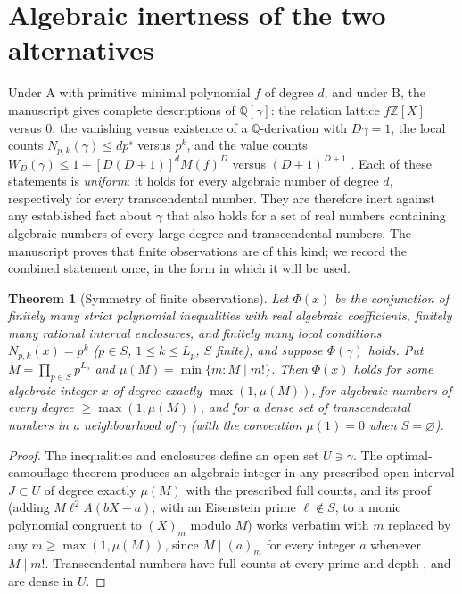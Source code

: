 \documentclass[11pt,a4paper]{article}
\newcommand{\Q}{\mathbb Q}
\newcommand{\Z}{\mathbb Z}
\newtheorem{theorem}{Theorem}[section]
\theoremstyle{definition}
\theoremstyle{remark}
\numberwithin{equation}{section}
\begin{document}
\section{Algebraic inertness of the two alternatives}\label{I:sec:inert}

Under $\mathrm A$ with primitive minimal polynomial $f$ of degree $d$, and under $\mathrm B$,
the manuscript gives complete descriptions of $\Q[\gamma]$: the relation lattice
$f\Z[X]$ versus $0$, the vanishing versus existence of a $\Q$-derivation with $D\gamma=1$,
the local counts $N_{p,k}(\gamma)\le dp^{s}$ versus $p^k$, and the value counts
$W_D(\gamma)\le1+[D(D+1)]^dM(f)^D$ versus $(D+1)^{D+1}$
\cite[Part~VI]{M}. Each of these statements is \emph{uniform}: it holds for every algebraic
number of degree $d$, respectively for every transcendental number. They are therefore
inert against any established fact about $\gamma$ that also holds for a set of real
numbers containing algebraic numbers of every large degree and transcendental numbers.
The manuscript proves that finite observations are of this kind; we record the combined
statement once, in the form in which it will be used.

\begin{theorem}[Symmetry of finite observations]\label{I:thm:symmetry}
Let $\Phi(x)$ be the conjunction of finitely many strict polynomial inequalities with
real algebraic coefficients, finitely many rational interval enclosures, and finitely many
local conditions $N_{p,k}(x)=p^k$ ($p\in S$, $1\le k\le L_p$, $S$ finite), and suppose
$\Phi(\gamma)$ holds. Put $M=\prod_{p\in S}p^{L_p}$ and $\mu(M)=\min\{m:M\mid m!\}$.
Then $\Phi(x)$ holds for some algebraic integer $x$ of degree exactly $\max(1,\mu(M))$,
for algebraic numbers of every degree $\ge\max(1,\mu(M))$, and for a dense set of
transcendental numbers in a neighbourhood of $\gamma$ (with the convention $\mu(1)=0$
when $S=\varnothing$).
\end{theorem}
\begin{proof}
The inequalities and enclosures define an open set $U\ni\gamma$. The optimal-camouflage
theorem \cite[Thm.~``Optimal finite camouflage'']{M} produces an algebraic integer in any
prescribed open interval $J\subset U$ of degree exactly $\mu(M)$ with the prescribed full
counts, and its proof (adding $M\ell^2A(bX-a)$, with an Eisenstein prime $\ell\notin S$,
to a monic polynomial congruent to $(X)_m$ modulo $M$) works verbatim with $m$ replaced by
any $m\ge\max(1,\mu(M))$, since $M\mid(a)_m$ for every integer $a$ whenever $M\mid m!$. Transcendental numbers have full counts at every
prime and depth \cite[eq.~``free counts'']{M}, and are dense in $U$.
\end{proof}
\end{document}
